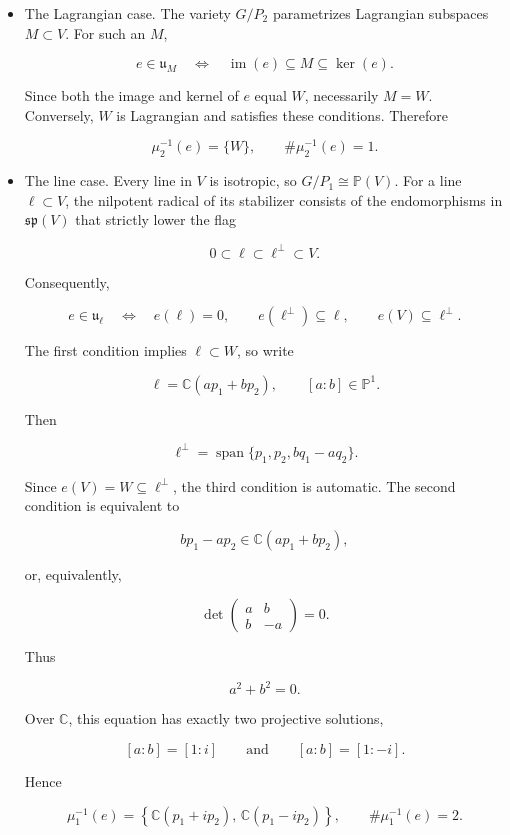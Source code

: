 \begin{itemize}
  \item The Lagrangian case. The variety \(G/P_2\) parametrizes Lagrangian subspaces \(M\subset V\). For such an \(M\),

\[
e\in\mathfrak u_M
\quad\Longleftrightarrow\quad
\operatorname{im}(e)\subseteq M\subseteq\ker(e).
\]

Since both the image and kernel of \(e\) equal \(W\), necessarily \(M=W\). Conversely, \(W\) is Lagrangian and satisfies these conditions. Therefore

\[
\mu_2^{-1}(e)=\{W\},
\qquad
\#\mu_2^{-1}(e)=1.
\]
  \item The line case. Every line in \(V\) is isotropic, so \(G/P_1\cong\mathbb P(V)\). For a line \(\ell\subset V\), the nilpotent radical of its stabilizer consists of the endomorphisms in \(\mathfrak{sp}(V)\) that strictly lower the flag

\[
0\subset\ell\subset\ell^\perp\subset V.
\]

Consequently,

\[
e\in\mathfrak u_\ell
\quad\Longleftrightarrow\quad
e(\ell)=0,\qquad
e(\ell^\perp)\subseteq\ell,\qquad
e(V)\subseteq\ell^\perp.
\]

The first condition implies \(\ell\subset W\), so write

\[
\ell=\mathbb C(ap_1+bp_2),
\qquad [a:b]\in\mathbb P^1.
\]

Then

\[
\ell^\perp
=\operatorname{span}\{p_1,p_2,bq_1-aq_2\}.
\]

Since \(e(V)=W\subseteq\ell^\perp\), the third condition is automatic. The second condition is equivalent to

\[
bp_1-ap_2\in\mathbb C(ap_1+bp_2),
\]

or, equivalently,

\[
\det
\begin{pmatrix}
a&b\\
b&-a
\end{pmatrix}
=0.
\]

Thus

\[
a^2+b^2=0.
\]

Over \(\mathbb C\), this equation has exactly two projective solutions,

\[
[a:b]=[1:i]\qquad\text{and}\qquad[a:b]=[1:-i].
\]

Hence

\[
\mu_1^{-1}(e)
=
\left\{
\mathbb C(p_1+ip_2),\,
\mathbb C(p_1-ip_2)
\right\},
\qquad
\#\mu_1^{-1}(e)=2.
\]
\end{itemize}

